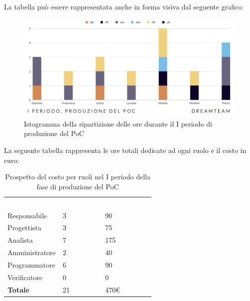 La tabella può essere rappresentata anche in forma visiva dal seguente grafico:
\begin{figure}[H]
\centering
\includegraphics[scale=0.65]{Sezioni/SezioniPreventivo/grafici/Poc_I_periodo.png}
\caption{Istogramma della ripartizione delle ore durante il I periodo di produzione del PoC}
\end{figure}

La seguente tabella rappresenta le ore totali dedicate ad ogni ruolo e il costo in euro:

\begin{table}[H]
\begin{center}
\renewcommand{\arraystretch}{1.5}
\begin{tabular}{ m{}<{\centering}  m{}<{\centering} m{}<{\centering}}
	\rowcolor{darkblue}
	\textcolor{white}{\textbf{Ruolo}}&\textcolor{white}{\textbf{Totale ore}}&\textcolor{white}{\textbf{Costo totale}}\\ 

	Responsabile  & 3 & 90 \\	
	
	Progettista & 3 & 75 \\
	
	Analista & 7 & 175 \\

	Amministratore & 2 & 40 \\
	
	Programmatore & 6 & 90 \\
	
	Verificatore & 0 & 0 \\
	
	\textbf{Totale} & 21 & 470\euro \\
	
\end{tabular}
\caption{Prospetto del costo per ruoli nel I periodo della fase di produzione del PoC}
\end{center}
\end{table}

